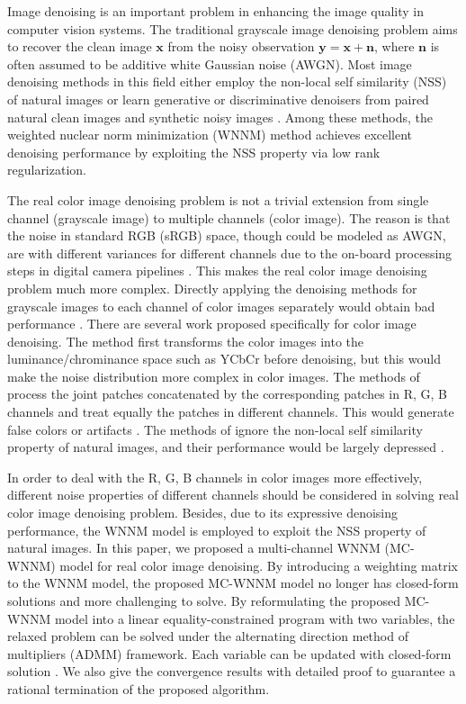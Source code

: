 \documentclass[10pt,twocolumn,letterpaper,sort&compress]{article}
\begin{document}
Image denoising is an important problem in enhancing the image quality in computer vision systems. The traditional grayscale image denoising problem aims to recover the clean image $\mathbf{x}$ from the noisy observation $\mathbf{y}=\mathbf{x}+\mathbf{n}$, where $\mathbf{n}$ is often assumed to be additive white Gaussian noise (AWGN). Most image denoising methods in this field either employ the non-local self similarity (NSS) of natural images \cite{nlm,bm3d,ksvd,lssc,ncsr,pgpd,wnnm} or learn generative or discriminative denoisers from paired natural clean images and synthetic noisy images \cite{foe,epll,mlp,csf,chen2015learning}. Among these methods, the weighted nuclear norm minimization (WNNM) method achieves excellent denoising performance by exploiting the NSS property via low rank regularization. 

The real color image denoising problem is not a trivial extension from single channel (grayscale image) to multiple channels (color image). The reason is that the noise in standard RGB (sRGB) space, though could be modeled as AWGN, are with different variances for different channels \cite{Leungtip} due to the on-board processing steps in digital camera pipelines \cite{crosschannel2016,karaimer_brown_ECCV_2016}. This makes the real color image denoising problem much more complex. Directly applying the denoising methods for grayscale images to each channel of color images separately would obtain bad performance \cite{mairal2008sparse}. There are several work  \cite{cbm3d,mairal2008sparse,Liu2008,noiseclinic,crosschannel2016,Zhu_2016_CVPR} proposed specifically for color image denoising. The method \cite{cbm3d} first transforms the color images into the luminance/chrominance space such as YCbCr before denoising, but this would make the noise distribution more complex in color images. The methods of \cite{mairal2008sparse,Zhu_2016_CVPR} process the joint patches concatenated by the corresponding patches in R, G, B channels and treat equally the patches in different channels. This would generate false colors or artifacts \cite{mairal2008sparse}. The methods of \cite{Liu2008,noiseclinic,crosschannel2016} ignore the non-local self similarity property of natural images, and their performance would be largely depressed \cite{bm3d,wnnm}.

In order to deal with the R, G, B channels in color images more effectively, different noise properties of different channels should be considered in solving real color image denoising problem. Besides, due to its expressive denoising performance, the WNNM model \cite{wnnm} is employed to exploit the NSS property of natural images. In this paper, we proposed a multi-channel WNNM (MC-WNNM) model for real color image denoising. By introducing a weighting matrix to the WNNM model, the proposed MC-WNNM model no longer has closed-form solutions and more challenging to solve. By reformulating the proposed MC-WNNM model into a linear equality-constrained program with two variables, the relaxed problem can be solved under the alternating direction method of multipliers (ADMM) \cite{admm} framework. Each variable can be updated with closed-form solution \cite{wnnm,lugsvt}. We also give the convergence results with detailed proof to guarantee a rational termination of the proposed algorithm. 
\end{document}
